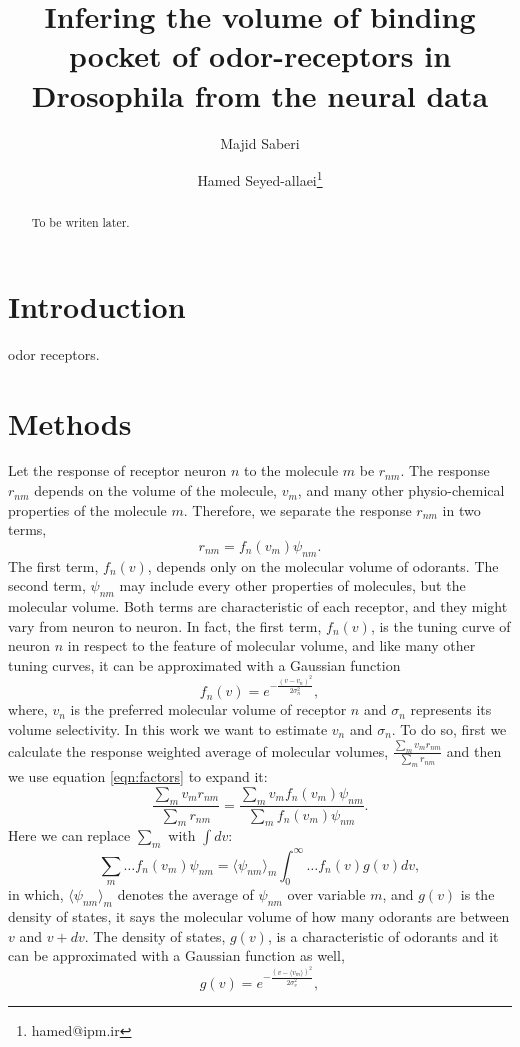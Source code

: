 \documentclass[11pt]{paper} %
\title{Infering the volume of binding pocket of odor-receptors in Drosophila from the neural data}
\author{Majid Saberi \and Hamed Seyed-allaei\thanks{hamed@ipm.ir}}
\begin{document}
\maketitle
\begin{abstract}
To be writen later.
\end{abstract}

\section{Introduction}

odor receptors.

\section{Methods}

Let the response of receptor neuron $n$ to the molecule $m$ be $r_{nm}$. 
The response $r_{nm}$ depends on the volume of the molecule, $v_m$, 
and many other physio-chemical properties of the molecule $m$.
Therefore, we separate the response $r_{nm}$ in two terms, 
\begin{equation}
r_{nm} = f_n(v_m) \psi_{nm}.
\label{eqn:factors}
\end{equation}
The first term, $f_n(v)$, depends only on the molecular volume of odorants.
The second term, $\psi_{nm}$ may include every other properties of molecules, but the molecular volume.
Both terms are characteristic of each receptor, and they might vary from neuron to neuron.
In fact, the first term, $f_n(v)$, is the tuning curve of neuron $n$ in respect to the feature of molecular volume, 
and like many other tuning curves, it can be approximated with a Gaussian function
\[
\displaystyle f_n(v) = e^{-\frac{(v-v_n)^2}{2\sigma^2_n}}, 
\]
where, $v_n$ is the preferred molecular volume of receptor $n$ and $\sigma_n$ represents its volume selectivity. 
In this work we want to estimate $v_n$ and $\sigma_n$. 
To do so, first we calculate the response weighted average of molecular volumes, 
$\frac{\sum_m v_m r_{nm}}{\sum_m r_{nm}}$ and then we use equation \ref{eqn:factors} to expand it:
\[
\frac{\displaystyle \sum_m v_m r_{nm}}{\displaystyle \sum_m r_{nm}} = \frac{\displaystyle \sum_m v_m f_n(v_m) \psi_{nm}}{\displaystyle \sum_m f_n(v_m) \psi_{nm}}.
\]
Here we can replace $\sum_m$ with $\int dv$:
\[
\sum_m \dots f_n(v_m) \psi_{nm} =  \langle \psi_{nm} \rangle_m \int_0^\infty \dots f_n(v) g(v)  dv, 
\]
in which, $\langle \psi_{nm} \rangle_m$ denotes the average of $\psi_{nm}$ over variable $m$, 
and $g(v)$ is the density of states, it says the molecular volume of how many odorants are between $v$ and $v+dv$.
The density of states, $g(v)$, is a characteristic of odorants and it can be approximated with a Gaussian function as well, 
\[
\displaystyle g(v) = e^{-\frac{(v- \langle v_m \rangle)^2}{2\sigma_{v}^2}},
\]
\end{document}
